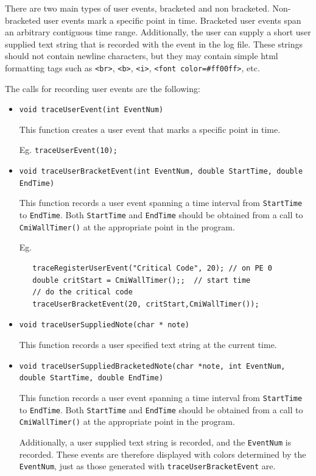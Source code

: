 \documentclass[10pt]{article}
\begin{document}
There are two main types of user events, bracketed and non bracketed. Non-bracketed user events mark a specific point in time. Bracketed user events span an arbitrary contiguous time range. Additionally, the user can supply a short user supplied text string that is recorded with the event in the log file. These strings should not contain newline characters, but they may contain simple html formatting tags such as \texttt{<br>}, \texttt{<b>}, \texttt{<i>}, \texttt{<font color=\#ff00ff>}, etc.

The calls for recording user events are the following:

\begin{itemize}


\item
{\tt void traceUserEvent(int EventNum) }

This function creates a user event that marks a specific point in time.

Eg. {\tt traceUserEvent(10);}

\item
{\tt void traceUserBracketEvent(int EventNum, double StartTime, double EndTime) }

This function records a user event spanning a time interval from {\tt StartTime} to {\tt EndTime}. Both {\tt StartTime} and {\tt EndTime} should be obtained from a call to {\tt CmiWallTimer()} at the appropriate point in the program.

Eg.
\begin{verbatim}
   traceRegisterUserEvent("Critical Code", 20); // on PE 0
   double critStart = CmiWallTimer();;  // start time
   // do the critical code
   traceUserBracketEvent(20, critStart,CmiWallTimer());
\end{verbatim}





\item
{\tt void traceUserSuppliedNote(char * note) }

This function records a user specified text string at the current time.




\item
{\tt void traceUserSuppliedBracketedNote(char *note, int EventNum, double StartTime, double EndTime)}

This function records a user event spanning a time interval from {\tt StartTime} to {\tt EndTime}. Both {\tt StartTime} and {\tt EndTime} should be obtained from a call to {\tt CmiWallTimer()} at the appropriate point in the program.

Additionally, a user supplied text string is recorded, and the  {\tt EventNum} is recorded. These events are therefore displayed with colors determined by the {\tt EventNum}, just as those generated with {\tt traceUserBracketEvent} are.

\end{itemize}
\end{document}
